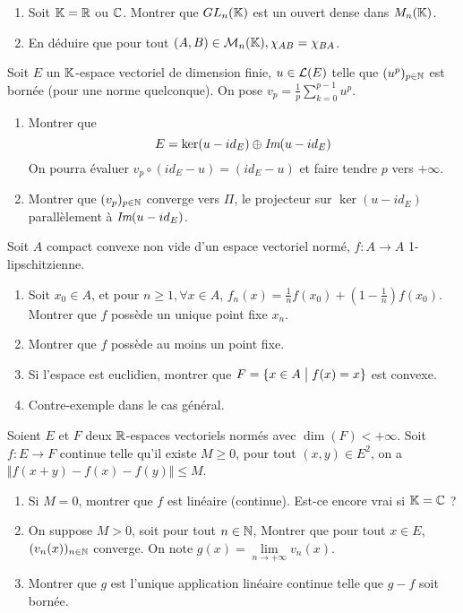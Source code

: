 \documentclass[12pt]{article}
\begin{document}
\begin{exercise}
	\phantom{}
	\begin{enumerate}
		\item Soit $\mathbb{K}=\mathbb{R}$ ou $\mathbb{C}$. Montrer que $GL_{n}(\mathbb{K})$ est un ouvert dense dans $M_{n}(\mathbb{K})$.
		\item En déduire que pour tout $(A,B)\in\mathcal{M}_{n}(\mathbb{K}),\chi_{AB}=\chi_{BA}$.
	\end{enumerate}
\end{exercise}

\begin{exercise}
	Soit $E$ un $\mathbb{K}$-espace vectoriel de dimension finie, $u\in\mathcal{L}(E)$ telle que $(u^{p})_{p\in\mathbb{N}}$ est bornée (pour une norme quelconque). On pose $v_{p}=\frac{1}{p}\sum_{k=0}^{p-1}u^{p}$.
	\begin{enumerate}
		\item Montrer que 
		$$E=\ker(u-id_{E})\oplus\emph{Im}(u-id_{E})$$
		On pourra évaluer $v_{p}\circ(id_{E}-u)=(id_{E}-u)$ et faire tendre $p$ vers $+\infty$.
		\item Montrer que $(v_{p})_{p\in\mathbb{N}}$ converge vers $\Pi$, le projecteur sur $\ker(u-id_{E})$ parallèlement à $\emph{Im}(u-id_{E})$.
	\end{enumerate}
\end{exercise}

\begin{exercise}
	Soit $A$ compact convexe non vide d'un espace vectoriel normé, $f:A\to A$ 1-lipschitzienne.
	\begin{enumerate}
		\item Soit $x_{0}\in A$, et pour $n\geqslant1,\forall x\in A$, $f_{n}(x)=\frac{1}{n}f(x_{0})+(1-\frac{1}{n})f(x_{0})$. Montrer que $f$ possède un unique point fixe $x_{n}$.
		\item Montrer que $f$ possède au moins un point fixe.
		\item Si l'espace est euclidien, montrer que $F=\{x\in A\bigm| f(x)=x\}$ est convexe.
		\item Contre-exemple dans le cas général.
	\end{enumerate}
\end{exercise}

\begin{exercise}
	Soient $E$ et $F$ deux $\mathbb{R}$-espaces vectoriels normés avec $\dim(F)<+\infty$. Soit $f:E\to F$ continue telle qu'il existe $M\geqslant0$, pour tout $(x,y)\in E^{2}$, on a $\Vert f(x+y)-f(x)-f(y)\Vert\leqslant M$.
	\begin{enumerate}
		\item Si $M=0$, montrer que $f$ est linéaire (continue). Est-ce encore vrai si $\mathbb{K}=\mathbb{C}$ ?
		\item On suppose $M>0$, soit pour tout $n\in\mathbb{N}$, 
		Montrer que pour tout $x\in E$, $(v_{n}(x))_{n\in\mathbb{N}}$ converge. On note $g(x)=\lim\limits_{n\to+\infty}v_{n}(x)$.
		\item Montrer que $g$ est l'unique application linéaire continue telle que $g-f$ soit bornée.
	\end{enumerate}
\end{exercise}
\end{document}
